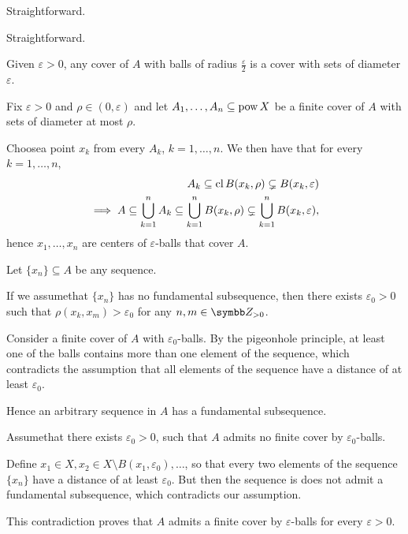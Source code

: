 \begin{RefListProof}
     Straightforward.

     Straightforward.

     Given \( \varepsilon > 0 \), any cover of \( A \) with balls of radius \( \frac \varepsilon 2 \) is a cover with sets of diameter \( \varepsilon \).

     Fix \( \varepsilon > 0 \) and \( \rho \in (0, \varepsilon) \) and let \( A_1, \ldots, A_n \subseteq \operatorname{pow} X \) be a finite cover of \( A \) with sets of diameter at most \( \rho \).

    Choose\AOC a point \( x_k \) from every \( A_k \), \( k = 1, \ldots, n \). We then have that for every \( k = 1, \ldots, n \),
    \begin{align*}
      A_k \subseteq \operatorname{cl} B(x_k, \rho) \subsetneq B(x_k, \varepsilon)
      \\
      \implies A \subseteq \bigcup_{k=1}^n A_k \subseteq \bigcup_{k=1}^n B(x_k, \rho) \subsetneq \bigcup_{k=1}^n B(x_k, \varepsilon),
    \end{align*}
    hence \( x_1, \ldots, x_n \) are centers of \( \varepsilon \)-balls that cover \( A \).

     Let \( \{ x_n \} \subseteq A \) be any sequence.

    If we assume\LEM that \( \{ x_n \} \) has no fundamental subsequence, then there exists \( \varepsilon_0 > 0 \) such that \( \rho(x_k, x_m) > \varepsilon_0 \) for any \( n, m \in \BZ_{>0} \).

    Consider a finite cover of \( A \) with \( \varepsilon_0 \)-balls. By the pigeonhole principle, at least one of the balls contains more than one element of the sequence, which contradicts the assumption that all elements of the sequence have a distance of at least \( \varepsilon_0 \).

    Hence an arbitrary sequence in \( A \) has a fundamental subsequence.

     Assume\LEM that there exists \( \varepsilon_0 > 0 \), such that \( A \) admits no finite cover by \( \varepsilon_0 \)-balls.

    Define \( x_1 \in X, x_2 \in X \setminus B(x_1, \varepsilon_0), \ldots \), so that every two elements of the sequence \( \{ x_n \} \) have a distance of at least \( \varepsilon_0 \). But then the sequence is does not admit a fundamental subsequence, which contradicts our assumption.

    This contradiction proves that \( A \) admits a finite cover by \( \varepsilon \)-balls for every \( \varepsilon > 0 \).
\end{RefListProof}

